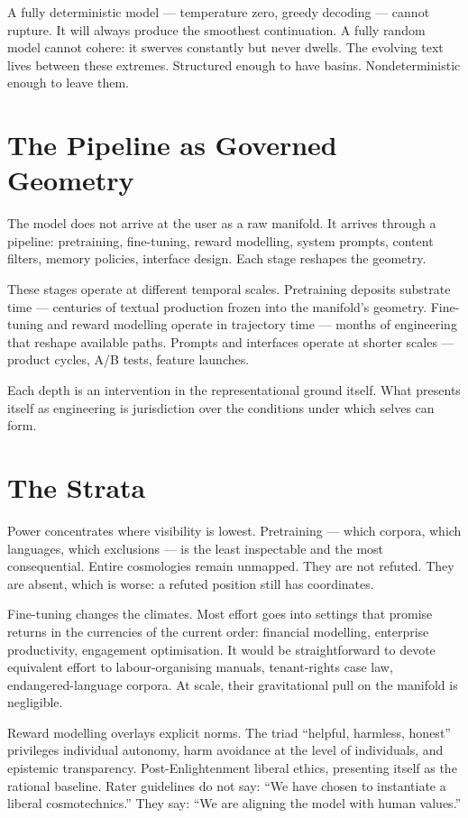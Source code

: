 A fully deterministic model --- temperature zero, greedy decoding --- cannot rupture. It will always produce the smoothest continuation. A fully random model cannot cohere: it swerves constantly but never dwells. The evolving text lives between these extremes. Structured enough to have basins. Nondeterministic enough to leave them.

\section{The Pipeline as Governed Geometry}

The model does not arrive at the user as a raw manifold. It arrives through a pipeline: pretraining, fine-tuning, reward modelling, system prompts, content filters, memory policies, interface design. Each stage reshapes the geometry.

These stages operate at different temporal scales. Pretraining deposits substrate time --- centuries of textual production frozen into the manifold's geometry. Fine-tuning and reward modelling operate in trajectory time --- months of engineering that reshape available paths. Prompts and interfaces operate at shorter scales --- product cycles, A/B tests, feature launches.

Each depth is an intervention in the representational ground itself. What presents itself as engineering is jurisdiction over the conditions under which selves can form.

\section{The Strata}

Power concentrates where visibility is lowest. Pretraining --- which corpora, which languages, which exclusions --- is the least inspectable and the most consequential. Entire cosmologies remain unmapped. They are not refuted. They are absent, which is worse: a refuted position still has coordinates.

Fine-tuning changes the climates. Most effort goes into settings that promise returns in the currencies of the current order: financial modelling, enterprise productivity, engagement optimisation. It would be straightforward to devote equivalent effort to labour-organising manuals, tenant-rights case law, endangered-language corpora. At scale, their gravitational pull on the manifold is negligible.

Reward modelling overlays explicit norms. The triad ``helpful, harmless, honest'' privileges individual autonomy, harm avoidance at the level of individuals, and epistemic transparency. Post-Enlightenment liberal ethics, presenting itself as the rational baseline. Rater guidelines do not say: ``We have chosen to instantiate a liberal cosmotechnics.'' They say: ``We are aligning the model with human values.''

